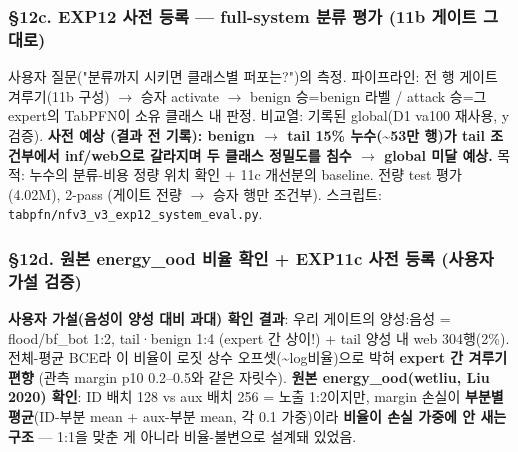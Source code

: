 \subsubsection{§12c. EXP12 사전 등록 — full-system 분류 평가 (11b 게이트 그대로)}
사용자 질문("분류까지 시키면 클래스별 퍼포는?")의 측정. 파이프라인: 전 행 게이트 겨루기(11b 구성)  \ensuremath{\rightarrow}  승자 activate  \ensuremath{\rightarrow}  benign 승=\allowbreak{}benign 라벨 /\allowbreak{} attack 승=\allowbreak{}그 expert의 TabPFN이 소유 클래스 내 판정. 비교열: 기록된 global(D1 va100 재사용, y 검증). \textbf{사전 예상 (결과 전 기록): benign \ensuremath{\rightarrow} tail 15\% 누수(\textasciitilde{}53만 행)가 tail 조건부에서 inf/\allowbreak{}web으로 갈라지며 두 클래스 정밀도를 침수  \ensuremath{\rightarrow}  global 미달 예상.} 목적: 누수의 분류-비용 정량 위치 확인 +\allowbreak{} 11c 개선분의 baseline. 전량 test 평가(4.02M), 2-pass (게이트 전량  \ensuremath{\rightarrow}  승자 행만 조건부). 스크립트: \texttt{tabpfn/\allowbreak{}\allowbreak{}n\allowbreak{}fv3\_\allowbreak{}\allowbreak{}v3\_\allowbreak{}\allowbreak{}e\allowbreak{}xp12\_\allowbreak{}\allowbreak{}sys\allowbreak{}tem\_\allowbreak{}\allowbreak{}eval\allowbreak{}.\allowbreak{}py}.

\subsubsection{§12d. 원본 energy\_\allowbreak{}ood 비율 확인 +\allowbreak{} EXP11c 사전 등록 (사용자 가설 검증)}
\textbf{사용자 가설(음성이 양성 대비 과대) 확인 결과}: 우리 게이트의 양성:음성 =\allowbreak{} flood/\allowbreak{}bf\_\allowbreak{}bot 1:2, tail·benign 1:4 (expert 간 상이!) +\allowbreak{} tail 양성 내 web 304행(2\%). 전체-평균 BCE라 이 비율이 로짓 상수 오프셋(\textasciitilde{}log비율)으로 박혀 \textbf{expert 간 겨루기 편향} (관측 margin p10 0.2–0.5와 같은 자릿수). \textbf{원본 energy\_\allowbreak{}ood(wetliu, Liu 2020) 확인}: ID 배치 128 vs aux 배치 256 =\allowbreak{} 노출 1:2이지만, margin 손실이 \textbf{부분별 평균}(ID-부분 mean +\allowbreak{} aux-부분 mean, 각 0.1 가중)이라 \textbf{비율이 손실 가중에 안 새는 구조} — 1:1을 맞춘 게 아니라 비율-불변으로 설계돼 있었음.


